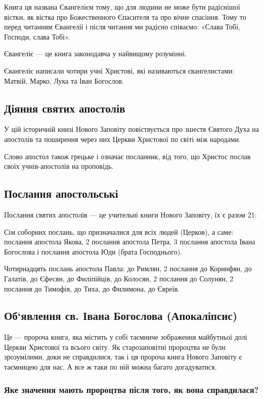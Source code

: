 \documentclass[main.tex]{subfiles}
\begin{document}
Книга ця названа Євангелієм тому, що для людини не може бути радіснішої вістки, як вістка про Божественного Єпасителя та про вічне спасіння. Тому то перед читанням Євангелії і після читання ми радісно співаємо: «Слава Тобі, Господи, слава Тобі».

Євангеліє — це книга законодавча у найвищому розумінні.

Євангеліє написали чотири учні Христові, які називаються євангелистами: Матвій, Марко, Лука та Іван Богослов.

\subsection{Діяння святих апостолів}

У цій історичній книзі Нового Заповіту повіствується про зшестя Євятого Духа на апостолів та поширення через них Церкви Христової по світі між народами.

Слово апостол також грецьке і означає посланник, від того, що Христос послав своїх учнів-апостолів на проповідь.
 
\subsection{Послання апостольські}

Послання святих апостолів — це учительні книги Нового Заповіту, їх є разом 21:

Сім соборних послань, що призначалися для всіх людей (Церков), а саме: послання апостола Якова, 2 послання апостола Петра, 3 послання апостола Івана Богослова і послання апостола Юди (брата Господнього).

Чотирнадцять послань апостола Павла: до Римлян, 2 послання до Коринфян, до Галатів, до Єфесян, до Филіпійців, до Колосян, 2 послання до Солунян, 2 послання до Тимофія, до Тиха, до Филимона, до Євреїв.

\subsection{Об`явлення св. Івана Богослова (Апокаліпсис)}

Це — пророча книга, яка містить у собі таємниче зображення майбутньої долі Церкви Христової та всього світу. Як старозаповітні пророцтва не були зрозумілими, доки не справдилися, так і ця пророча книга Нового Заповіту є таємницею для нас. А все ж таки по ній можна багато догадуватися.

\subsubsection{Яке значення мають пророцтва після того, як вона справдилася?}
\end{document}
